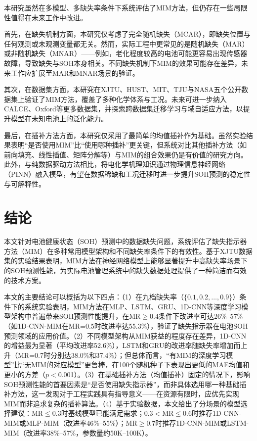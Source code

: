 \documentclass[10pt,a4paper]{ctexart}
\begin{document}
本研究虽然在多模型、多缺失率条件下系统评估了MIM方法，但仍存在一些局限性值得在未来工作中改进。

首先，在缺失机制方面，本研究仅考虑了完全随机缺失（MCAR），即缺失位置与任何观测或未观测变量都无关。然而，实际工程中更常见的是随机缺失（MAR）或非随机缺失（MNAR）——例如，老化程度较高的电池可能更容易出现传感器故障，导致缺失与SOH本身相关。不同缺失机制下MIM的效果可能存在差异，未来工作应扩展至MAR和MNAR场景的验证。

其次，在数据集方面，本研究在XJTU、HUST、MIT、TJU与NASA五个公开数据集上验证了MIM方法，覆盖了多种化学体系与工况。未来可进一步纳入CALCE、Oxford等更多数据集，并探索跨数据集迁移学习与域自适应方法，以提升模型在未知电池上的泛化能力。

最后，在插补方法方面，本研究仅采用了最简单的均值插补作为基础。虽然实验结果表明“是否使用MIM”比“使用哪种插补”更关键，但系统对比其他插补方法（如前向填充、线性插值、矩阵分解等）与MIM的组合效果仍是有价值的研究方向。此外，与纯数据驱动方法相比，将电化学机理知识通过物理信息神经网络（PINN）融入模型，有望在数据稀缺和工况迁移时进一步提升SOH预测的稳定性与可解释性\cite{wang2024pinn}。

\section{结论}\label{sec:conclusion}

本文针对电池健康状态（SOH）预测中的数据缺失问题，系统评估了缺失指示器方法（MIM）在多种常用模型架构和不同缺失率条件下的有效性。基于XJTU数据集的实验结果表明，MIM方法在神经网络模型上能够显著提升中高缺失率场景下的SOH预测性能，为实际电池管理系统中的缺失数据处理提供了一种简洁而有效的技术方案。

本文的主要结论可以概括为以下四点：（1）在九档缺失率（$\{0.1, 0.2, \ldots, 0.9\}$）条件下的系统实验表明，MIM方法在MLP、LSTM、GRU、1D-CNN等深度学习模型架构中普遍带来SOH预测性能提升，在MR$\geq 0.4$条件下改进率可达26\%--57\%（如1D-CNN-MIM在MR=0.5时改进率达55.3\%），验证了缺失指示器在电池SOH预测领域的应用价值。（2）不同模型架构从MIM获益的程度存在差异，1D-CNN的增益最为显著（平均改进率52.6\%），LSTM和GRU的改进率随缺失率增加而上升（MR=0.7时分别达38.0\%和37.4\%）；但总体而言，“有MIM的深度学习模型”比“无MIM的对应模型”更鲁棒，在100个随机种子下表现出更低的MAE均值和更小的方差（$p<$0.001）。（3）在基础插补方法（均值插补）固定的情况下，影响SOH预测性能的首要因素是“是否使用缺失指示器”，而非具体选用哪一种基础插补方法，这一发现对于工程实践具有指导意义——在资源有限时，应优先实现MIM而非追求复杂的插补算法。（4）基于实验数据，本文给出了分场景的模型选择建议：MR$\leq$0.3时基线模型已能满足需求；0.3$<$MR$\leq$0.6时推荐1D-CNN-MIM或MLP-MIM（改进率46\%--55\%）；MR$\geq$0.7时推荐1D-CNN-MIM或LSTM-MIM（改进率38\%--57\%，参数量约50K--100K）。
\end{document}
